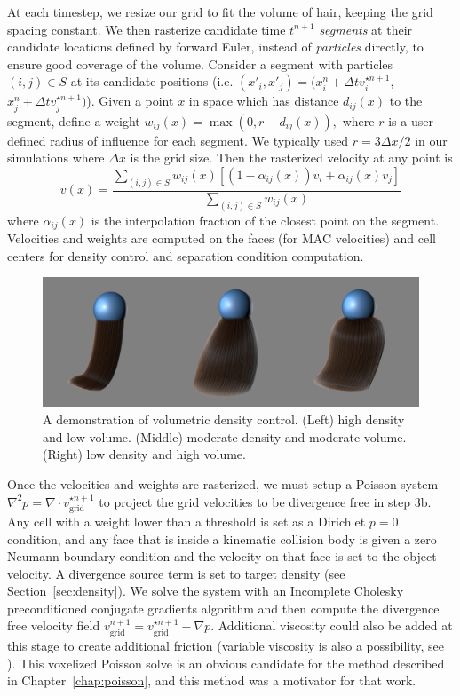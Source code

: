 At each timestep, we resize our grid to fit the volume of hair,
keeping the grid spacing constant.  We then rasterize candidate time
$t^{n+1}$ \emph{segments} at their candidate locations defined
by forward Euler, instead of \emph{particles} directly, to ensure good coverage of the
volume.  Consider a segment with particles $(i,j)\in S$ at its candidate
positions (i.e. $(x'_i,x'_j)=(x^n_i+\Delta t v^{\star n+1}_i$,$x^n_j+\Delta t
v_j^{\star n+1})$). Given a point $x$ in space which has distance $d_{ij}(x)$ to the
segment, define a weight 
$w_{ij}(x)=\max\left(0,r-d_{ij}(x)\right),$
where $r$ is a user-defined radius of influence for each segment.  We typically
used $r=3\Delta x/2$ in our simulations where $\Delta x$ is the grid
size. Then the rasterized velocity at any point is
$$v(x)= \frac{\sum_{(i,j)\in S} w_{ij}(x)[ (1-\alpha_{ij}(x)) v_i +
    \alpha_{ij}(x) v_j ]}{\sum_{(i,j)\in S} w_{ij}(x)}$$
where $\alpha_{ij}(x)$ is the interpolation fraction of the closest point on the
segment. Velocities and weights are computed on the faces (for MAC velocities)
and cell centers for density control and separation condition computation. 


\begin{figure}[t]
  \centering
\includegraphics[width=.99\linewidth]{hair/images/density/density-figure}
  \caption[A demonstration of volumetric density
    control.]{\label{fig:density} A demonstration of volumetric density
    control. (Left) high density and low volume. (Middle) moderate density and
    moderate volume. (Right) low density and high volume.}
\end{figure}

Once the velocities and weights are rasterized, we must setup a
Poisson system $\nabla^2p=\nabla \cdot v_\textrm{grid}^{\star n+1}$ to
project the grid velocities to be divergence free in step 3b. Any cell
with a weight lower than a threshold is set as a Dirichlet $p=0$
condition, and any face that is inside a kinematic collision body is
given a zero Neumann boundary condition and the velocity on that face is set to
the object velocity. A divergence source term is set to target density
(see Section~\ref{sec:density}). We solve the system with an
Incomplete Cholesky preconditioned conjugate gradients algorithm and then compute the 
divergence free
velocity field $v^{n+1}_\textrm{grid}=v_\textrm{grid}^{\star
  n+1}-\nabla p$. Additional viscosity could also be added at this stage to
create additional friction (variable viscosity is also a
possibility, see \cite{Carlson:2002:MAF,rasmussen:2004:t3}).  This
voxelized Poisson solve is an obvious candidate for the method
described in Chapter~\ref{chap:poisson}, and this method was a motivator
for that work.

